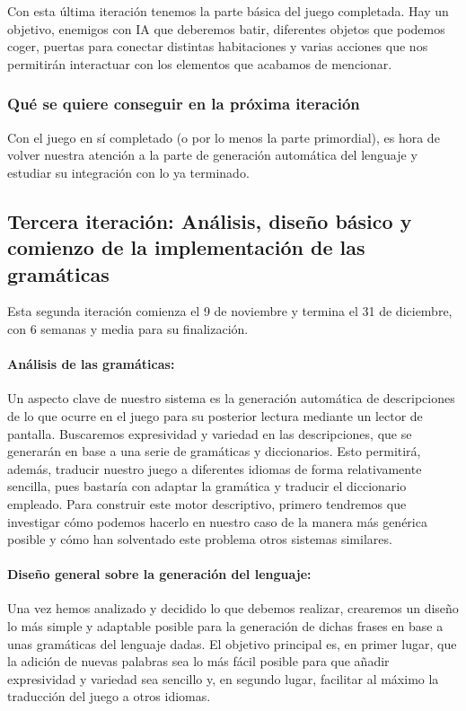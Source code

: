 Con esta última iteración tenemos la parte básica del juego completada. Hay un objetivo, enemigos con IA que deberemos batir, diferentes objetos que podemos coger, puertas para conectar distintas habitaciones y varias acciones que nos permitirán interactuar con los elementos que acabamos de mencionar.

\subsubsection{Qué se quiere conseguir en la próxima iteración}

Con el juego en sí completado (o por lo menos la parte primordial), es hora de volver nuestra atención a la parte de generación automática del lenguaje y estudiar su integración con lo ya terminado.

\subsection{Tercera iteración: Análisis, diseño básico y comienzo de la implementación de las gramáticas}

Esta segunda iteración comienza el 9 de noviembre y termina el 31 de diciembre, con 6 semanas y media para su finalización.

\paragraph{Análisis de las gramáticas:} Un aspecto clave de nuestro sistema es la generación automática de descripciones de lo que ocurre en el juego para su posterior lectura mediante un lector de pantalla. Buscaremos expresividad y variedad en las descripciones, que se generarán en base a una serie de gramáticas y diccionarios. Esto permitirá, además, traducir nuestro juego a diferentes idiomas de forma relativamente sencilla, pues bastaría con adaptar la gramática y traducir el diccionario empleado. Para construir este motor descriptivo, primero tendremos que investigar cómo podemos hacerlo en nuestro caso de la manera más genérica posible y cómo han solventado este problema otros sistemas similares.

\paragraph{Diseño general sobre la generación del lenguaje:} Una vez hemos analizado y decidido lo que debemos realizar, crearemos un diseño lo más simple y adaptable posible para la generación de dichas frases en base a unas gramáticas del lenguaje dadas. El objetivo principal es, en primer lugar, que la adición de nuevas palabras sea lo más fácil posible para que añadir expresividad y variedad sea sencillo y, en segundo lugar, facilitar al máximo la traducción del juego a otros idiomas.

